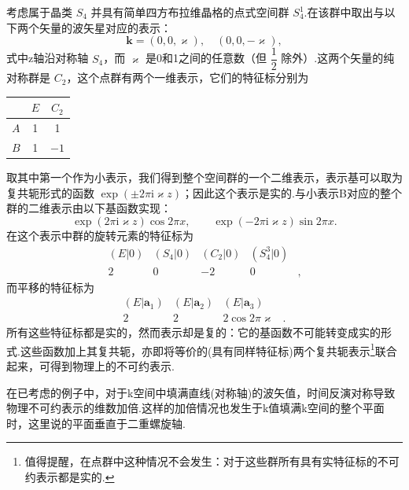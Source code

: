 考虑属于晶类 $S_4$ 并具有简单四方布拉维晶格的点式空间群 $S_4^1$.在该群中取出与以下两个矢量的波矢星对应的表示：
\begin{equation}
  \boldsymbol{k}=(0,0,\varkappa),\quad (0,0,-\varkappa),
\end{equation}
式中z轴沿对称轴 $S_4$，而 $\varkappa$ 是0和1之间的任意数（但 $\dfrac{1}{2}$ 除外）.这两个矢量的纯对称群是 $C_2$，这个点群有两个一维表示，它们的特征标分别为
\begin{center}
\begin{tabular}{lcc}
\hline
 & $E$ & $C_2$ \\
\hline
$A$ & 1 & 1 \\
$B$ & 1 & $-1$ \\
\hline
\end{tabular}
\end{center}
取其中第一个作为小表示，我们得到整个空间群的一个二维表示，表示基可以取为复共轭形式的函数 $\exp(\pm2\pi\mathrm{i}\varkappa z)$；因此这个表示是实的.与小表示B对应的整个群的二维表示由以下基函数实现：
\begin{equation*}
  \exp(2\pi\mathrm{i}\varkappa z)\cos2\pi x,\qquad
  \exp(-2\pi\mathrm{i}\varkappa z)\sin2\pi x.
\end{equation*}
在这个表示中群的旋转元素的特征标为
\begin{equation*}
\begin{array}{ccccc}
  (E|0) & (S_4|0) & (C_2|0) & (S_4^3|0) & \\
  2 & 0 & -2 & 0 & ,
\end{array}
\end{equation*}
而平移的特征标为
\begin{equation*}
\begin{array}{cccc}
  (E|\boldsymbol{a}_1) & (E|\boldsymbol{a}_2) & (E|\boldsymbol{a}_3) & \\
  2 & 2 & 2\cos2\pi\varkappa & .
\end{array}
\end{equation*}
所有这些特征标都是实的，然而表示却是复的：它的基函数不可能转变成实的形式.这些函数加上其复共轭，亦即将等价的(具有同样特征标)两个复共轭表示\footnote{值得提醒，在点群中这种情况不会发生：对于这些群所有具有实特征标的不可约表示都是实的.}联合起来，可得到物理上的不可约表示.

在已考虑的例子中，对于k空间中填满直线(对称轴)的波矢值，时间反演对称导致物理不可约表示的维数加倍.这样的加倍情况也发生于k值填满k空间的整个平面时，这里说的平面垂直于二重螺旋轴.

